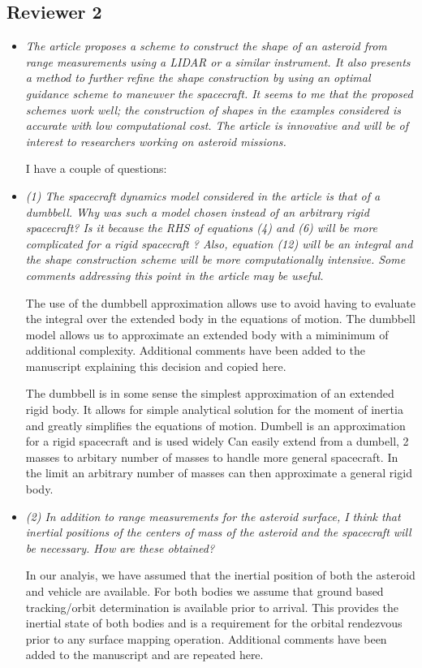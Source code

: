 \documentclass[11pt]{article}
\newcommand{\comment}[1]{\item \itshape #1 \normalfont}
\begin{document}
\subsection*{Reviewer 2}
\begin{itemize}\setlength{\itemsep}{2\parsep}

    
    \comment{The article proposes a scheme to construct the shape of an asteroid from range measurements using a LIDAR or a similar instrument. 
        It also presents a method to further refine the shape construction by using an optimal guidance scheme to maneuver the spacecraft. 
        It seems to me that the proposed schemes work well; the construction of shapes in the examples considered is accurate with low computational cost. 
        The article is innovative and will be of interest to researchers working on asteroid missions.   

        I have a couple of questions:
    }


\comment{(1) The spacecraft dynamics model considered in the article is that of a dumbbell. 
Why was such a model chosen instead of an arbitrary rigid spacecraft?
Is it because the RHS of equations (4) and (6) will be more complicated for a rigid spacecraft ?
Also, equation (12) will be an integral and the shape construction scheme will be more computationally intensive.
Some comments addressing this point in the article may be useful.}

The use of the dumbbell approximation allows use to avoid having to evaluate the integral over the extended body in the equations of motion.
The dumbbell model allows us to approximate an extended body with a miminimum of additional complexity.
Additional comments have been added to the manuscript explaining this decision and copied here.

The dumbbell is in some sense the simplest approximation of an extended rigid body.
It allows for simple analytical solution for the moment of inertia and greatly simplifies the equations of motion.
Dumbell is an approximation for a rigid spacecraft and is used widely 
Can easily extend from a dumbell, 2 masses to arbitary number of masses to handle more general spacecraft. 
In the limit an arbitrary number of masses can then approximate a general rigid body.

\comment{(2) In addition to range measurements for the asteroid surface, I think that inertial positions of the centers of mass of the asteroid and the spacecraft will be necessary.
How are these obtained?}

In our analyis, we have assumed that the inertial position of both the asteroid and vehicle are available.
For both bodies we assume that ground based tracking/orbit determination is available prior to arrival.
This provides the inertial state of both bodies and is a requirement for the orbital rendezvous prior to any surface mapping operation.
Additional comments have been added to the manuscript and are repeated here.

\end{itemize}
\end{document}
